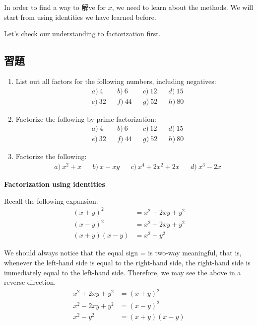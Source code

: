 \documentclass[12pt]{article}
\begin{document}
    In order to find a way to 解ve for $x$, we need to learn about the methods. We will start from using identities we have learned before.

    Let's check our understanding to factorization first.
    \subsection*{習題}
    \begin{enumerate}
        \item List out all factors for the following numbers, including negatives:\begin{align*}
            &a)\ 4&&b)\ 6&&c)\ 12&&d)\ 15\\
            &e)\ 32&&f)\ 44&&g)\ 52&&h)\ 80
        \end{align*}
        \item Factorize the following by prime factorization:\begin{align*}
            &a)\ 4&&b)\ 6&&c)\ 12&&d)\ 15\\
            &e)\ 32&&f)\ 44&&g)\ 52&&h)\ 80
        \end{align*}
        \item Factorize the following:\begin{align*}
            &a)\ x^2+x&&b)\ x-xy&&c)\ x^4+2x^2+2x&&d)\ x^3-2x
        \end{align*}
    \end{enumerate}

    \begin{center}
        \textbf{Factorization using identities}
    \end{center}

    Recall the following expansion:\begin{align*}
        (x+y)^2&=x^2+2xy+y^2\\
        (x-y)^2&=x^2-2xy+y^2\\
        (x+y)(x-y)&=x^2-y^2
    \end{align*}

    We should always notice that the equal sign = is two-way meaningful, that is, whenever the left-hand side is equal to the right-hand side, the right-hand side is immediately equal to the left-hand side. Therefore, we may see the above in a reverse direction.\begin{align*}
        x^2+2xy+y^2&=(x+y)^2\\
        x^2-2xy+y^2&=(x-y)^2\\
        x^2-y^2&=(x+y)(x-y)
    \end{align*}
\end{document}
